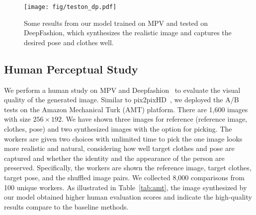 \documentclass[10pt,twocolumn,letterpaper]{article}
\begin{document}
\begin{figure}[!hp]
\centering
\texttt{[image: fig/teston\_dp.pdf]} 
\caption{Some results from our model trained on MPV and tested on DeepFashion, which synthesizes the realistic image and captures the desired pose and clothes well.}
\label{fig:teston_dp}
\vspace{-4mm}
\end{figure}



\begin{table}[h]
\centering
\caption{Pairwise comparison on MPV and DeepFashion. Each cell lists the percentage where our MG-VTON is preferred over the other method. Chance is at 50\%. }
\vspace{2mm}
\label{tab:amt}
\vspace{-4mm}
\end{table}
\subsection{Human Perceptual Study}
We perform a human study on MPV and Deepfashion~\cite{liu2016deepfashion} to evaluate the visual quality of the generated image. Similar to pix2pixHD~\cite{wang2017pix2pixHD}, we deployed the A/B tests on the Amazon Mechanical Turk (AMT) platform. There are 1,600 images with size $256 \times 192$. We have shown three images for reference (reference image, clothes, pose) and two synthesized images with the option for picking. The workers are given two choices with unlimited time to pick the one image looks more realistic and natural, considering how well target clothes and pose are captured and whether the identity and the appearance of the person are preserved. Specifically, the workers are shown the reference image, target clothes, target pose, and the shuffled image pairs. We collected 8,000 comparisons from 100 unique workers. As illustrated in Table~\ref{tab:amt}, the image synthesized by our model obtained higher human evaluation scores and indicate the high-quality results compare to the baseline methods.
\end{document}
